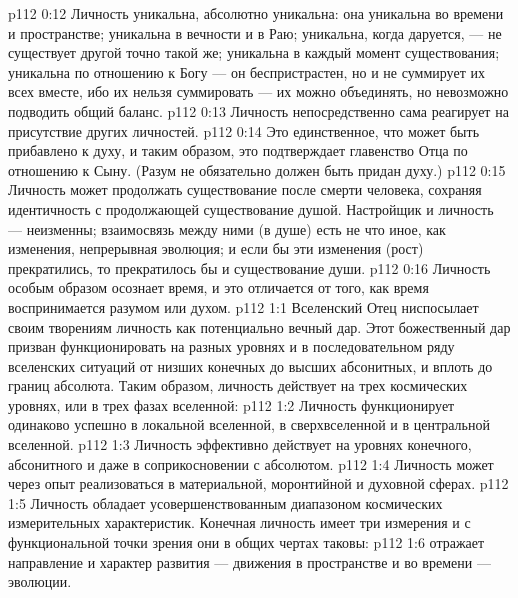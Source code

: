 \vs p112 0:12 \pc {}\bibnobreakspace Личность уникальна, абсолютно уникальна: она уникальна во времени и пространстве; уникальна в вечности и в Раю; уникальна, когда даруется, --- не существует другой точно такой же; уникальна в каждый момент существования; уникальна по отношению к Богу --- он беспристрастен, но и не суммирует их всех вместе, ибо их нельзя суммировать --- их можно объединять, но невозможно подводить общий баланс.
\vs p112 0:13 \pc {}\bibnobreakspace Личность непосредственно сама реагирует на присутствие других личностей.
\vs p112 0:14 \pc {}\bibnobreakspace Это единственное, что может быть прибавлено к духу, и таким образом, это подтверждает главенство Отца по отношению к Сыну. (Разум не обязательно должен быть придан духу.)
\vs p112 0:15 \pc {}\bibnobreakspace Личность может продолжать существование после смерти человека, сохраняя идентичность с продолжающей существование душой. Настройщик и личность --- неизменны; взаимосвязь между ними (в душе) есть не что иное, как изменения, непрерывная эволюция; и если бы эти изменения (рост) прекратились, то прекратилось бы и существование души.
\vs p112 0:16 \pc {}\bibnobreakspace Личность особым образом осознает время, и это отличается от того, как время воспринимается разумом или духом.
\vs p112 1:1 Вселенский Отец ниспосылает своим творениям личность как потенциально вечный дар. Этот божественный дар призван функционировать на разных уровнях и в последовательном ряду вселенских ситуаций от низших конечных до высших абсонитных, и вплоть до границ абсолюта. Таким образом, личность действует на трех космических уровнях, или в трех фазах вселенной:
\vs p112 1:2 \bibnobreakspace {} Личность функционирует одинаково успешно в локальной вселенной, в сверхвселенной и в центральной вселенной.
\vs p112 1:3 \pc {}\bibnobreakspace {} Личность эффективно действует на уровнях конечного, абсонитного и даже в соприкосновении с абсолютом.
\vs p112 1:4 \pc {}\bibnobreakspace {} Личность может через опыт реализоваться в материальной, моронтийной и духовной сферах.
\vs p112 1:5 \pc Личность обладает усовершенствованным диапазоном космических измерительных характеристик. Конечная личность имеет три измерения и с функциональной точки зрения они в общих чертах таковы:
\vs p112 1:6 \bibnobreakspace {} отражает направление и характер развития --- движения в пространстве и во времени --- эволюции.
